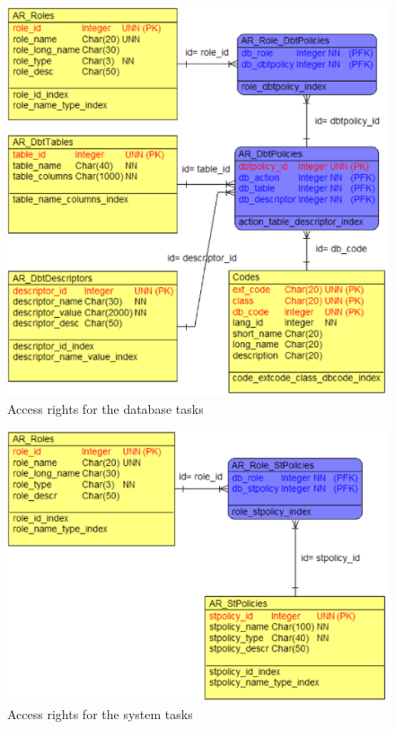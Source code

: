 \begin{figure}
\begin{center}%
   \includegraphics[scale=1]{./access-control/ar_dbtpolicies.eps}
   \caption{Access rights for the database tasks}
   \label{fig:dbt_policies}
\end{center}
\end{figure}

\begin{figure}
\begin{center}%
   \includegraphics[scale=1]{./access-control/ar_stpolicies.eps}
   \caption{Access rights for the system tasks}
   \label{fig:stpolicies}
\end{center}
\end{figure}

